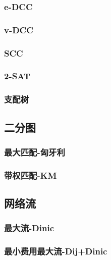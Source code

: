 \documentclass[twocolumn,a4]{article}
\newcommand{\addcpp}[1]{}
\begin{document}
		\subsubsection{e-DCC}
		\subsubsection{v-DCC}
		\subsubsection{SCC}
		\subsubsection{2-SAT}
			\addcpp{graph/2-SAT}
		\subsubsection{支配树}
	\subsection{二分图}
		\subsubsection{最大匹配-匈牙利}		
			\addcpp{graph/hungary}
		\subsubsection{带权匹配-KM}
			\addcpp{graph/KM}
	\subsection{网络流}
		\subsubsection{最大流-Dinic}
			\addcpp{graph/MF_dinic}
		\subsubsection{最小费用最大流-Dij+Dinic}
			\addcpp{graph/MSMF_dij_dinic}
\end{document}
